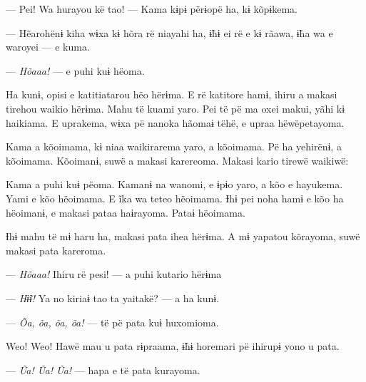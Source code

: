 --- Pei! Wa hurayou kë tao! --- Kama kɨpɨ përɨopë ha, kɨ kõpɨkema. 


--- Hẽarohënɨ kiha wɨxa kɨ hõra rë niayahi ha, ɨ̃hɨ ei rë e kɨ rãawa, ɨ̃ha
 wa e waroyei --- e kuma. 

--- \textit{Hõaaa!} --- e puhi kuɨ hëoma. 

Ha kunɨ, opisi e katitiatarou hëo hërɨma. E rë katitore hamɨ, ihiru a
makasi tirehou waikio hërɨma. Mahu të kuami yaro. Pei të pë ma oxei
makui, yãhi kɨ haikiama. E uprakema, wɨxa pë nanoka hãomaɨ tëhë, e upraa
hëwëpetayoma. 

Kama a kõoimama, kɨ niaa waikirarema yaro, a kõoimama. Pë ha yehirënɨ, a
kõoimama. Kõoimanɨ, suwë a makasi karereoma. Makasi kario tirewë
waikiwë:


Kama a puhi kuɨ pëoma. Kamanɨ na wanomi, e ɨpɨo yaro, a kõo e hayukema.
Yami e kõo hëoimama. E ĩka wa teteo hëoimama. Ɨhɨ pei noha hamɨ e kõo ha
hëoimanɨ, e makasi pataa haɨrayoma. Pataɨ hëoimama. 

Ɨhɨ mahu të mɨ haru ha, makasi pata ihea hërɨma. A mɨ yapatou kõrayoma,
suwë makasi pata kareroma. 

--- \textit{Hõaaa!} Ihiru rë pesi! --- a puhi kutario hërɨma 

--- \textit{Hɨ̃ɨ! }Ya no kiriaɨ tao ta yaitakë? --- a ha kunɨ. 


--- \textit{Õa, õa, õa, õa!} --- të pë pata kuɨ huxomioma. 


Weo! Weo! Hawë mau u pata rɨpraama, ɨ̃hɨ horemari pë ihirupɨ yono u
pata. 

--- \textit{Ũa! Ũa! Ũa!} --- hapa e të pata kurayoma. 

